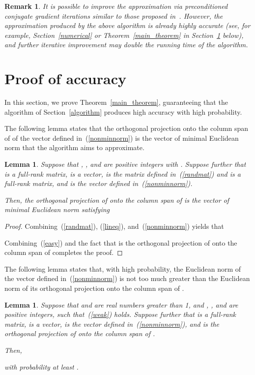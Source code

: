 \documentclass[letterpaper,12pt]{article}
\newtheorem{lemma}[theorem]{Lemma}
\newtheorem{remark1}[theorem]{Remark}
\newenvironment{remark}{\begin{remark1} \rm}{\end{remark1}}
\begin{document}
\begin{remark}
It is possible to improve the approximation 
via preconditioned conjugate gradient iterations similar to those
proposed in~\cite{rokhlin-tygert}.
However, the approximation produced by the above algorithm
is already highly accurate (see, for example, Section~\ref{numerical}
or Theorem~\ref{main_theorem} in Section~\ref{proofs} below),
and further iterative improvement may double the running time of the algorithm.
\end{remark}



\section{Proof of accuracy}
\label{proofs}

In this section, we prove Theorem~\ref{main_theorem},
guaranteeing that the algorithm of Section~\ref{algorithm}
produces high accuracy with high probability.


The following lemma states that the orthogonal projection
onto the column span of 
of the vector  defined in~(\ref{nonminnorm})
is the vector of minimal Euclidean norm that the algorithm aims to approximate.

\begin{lemma}
\label{baselemma}
Suppose that , , and  are positive integers with .
Suppose further that  is a full-rank matrix,
 is a vector,
 is the matrix defined in~(\ref{randmat})
and is a full-rank matrix,
and  is the vector defined in~(\ref{nonminnorm}).

Then, the orthogonal projection 
of  onto the column span of 
is the vector of minimal Euclidean norm satisfying

\end{lemma}

\begin{proof}
Combining~(\ref{randmat}), (\ref{lineq}), and~(\ref{nonminnorm}) yields that

Combining~(\ref{easy}) and the fact that 
is the orthogonal projection of  onto the column span
of  completes the proof.
\end{proof}


The following lemma states that, with high probability, the Euclidean norm
of the vector  defined in~(\ref{nonminnorm})
is not too much greater than the Euclidean norm
of its orthogonal projection  onto the column span
of .

\begin{lemma}
\label{problemma}
Suppose that  and  are real numbers greater than 1,
and , , and  are positive integers, such that~(\ref{weak}) holds.
Suppose further that  is a full-rank matrix,
 is a vector,
 is the vector defined in~(\ref{nonminnorm}),
and  is the orthogonal projection of 
onto the column span of .

Then,

with probability at least .
\end{lemma}
\end{document}
